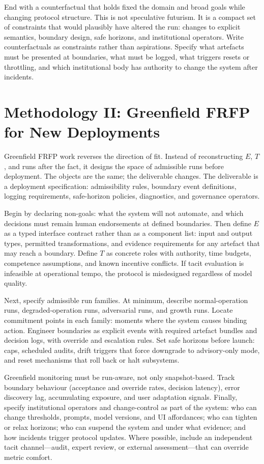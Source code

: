 End with a counterfactual that holds fixed the domain and broad goals while changing protocol structure. This is not speculative futurism. It is a compact set of constraints that would plausibly have altered the run: changes to explicit semantics, boundary design, safe horizons, and institutional operators. Write counterfactuals as constraints rather than aspirations. Specify what artefacts must be presented at boundaries, what must be logged, what triggers resets or throttling, and which institutional body has authority to change the system after incidents.

\section{Methodology II: Greenfield FRFP for New Deployments}
\label{sec:frfp-greenfield}

Greenfield FRFP work reverses the direction of fit. Instead of reconstructing \(E\), \(T\), and runs after the fact, it designs the space of admissible runs before deployment. The objects are the same; the deliverable changes. The deliverable is a deployment specification: admissibility rules, boundary event definitions, logging requirements, safe-horizon policies, diagnostics, and governance operators.

Begin by declaring non-goals: what the system will not automate, and which decisions must remain human endorsements at defined boundaries. Then define \(E\) as a typed interface contract rather than as a component list: input and output types, permitted transformations, and evidence requirements for any artefact that may reach a boundary. Define \(T\) as concrete roles with authority, time budgets, competence assumptions, and known incentive conflicts. If tacit evaluation is infeasible at operational tempo, the protocol is misdesigned regardless of model quality.

Next, specify admissible run families. At minimum, describe normal-operation runs, degraded-operation runs, adversarial runs, and growth runs. Locate commitment points in each family: moments where the system causes binding action. Engineer boundaries as explicit events with required artefact bundles and decision logs, with override and escalation rules. Set safe horizons before launch: caps, scheduled audits, drift triggers that force downgrade to advisory-only mode, and reset mechanisms that roll back or halt subsystems.

Greenfield monitoring must be run-aware, not only snapshot-based. Track boundary behaviour (acceptance and override rates, decision latency), error discovery lag, accumulating exposure, and user adaptation signals. Finally, specify institutional operators and change-control as part of the system: who can change thresholds, prompts, model versions, and UI affordances; who can tighten or relax horizons; who can suspend the system and under what evidence; and how incidents trigger protocol updates. Where possible, include an independent tacit channel---audit, expert review, or external assessment---that can override metric comfort.

